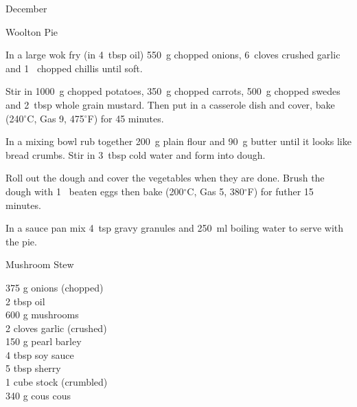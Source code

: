 \begin{menu}{December}
\begin{recipe}{2}{Woolton Pie}
\begin{ingredients}
		\end{ingredients}
	
	
    \begin{instructions}
    \item 
        In a large wok fry
        (in 4~tbsp  oil)
        550~g chopped onions,
        6~cloves crushed garlic
        and
        1~ chopped chillis
        until soft.
      \item 
        Stir in
        1000~g chopped potatoes,
        350~g chopped carrots,
        500~g chopped swedes
        and
        2~tbsp  whole grain mustard.
        Then put in a casserole dish and cover,
        bake (240$^{\circ}$C, Gas 9, 475$^{\circ}$F) for 45 minutes.
      \item 
        In a mixing bowl
        rub together
        200~g  plain flour
        and
        90~g  butter
        until it looks like bread crumbs.
        Stir in
        3~tbsp  cold water
        and form into dough.
      \item 
        Roll out the dough and cover the vegetables when they are done.
        Brush the dough with 1~ beaten eggs
        then bake (200$^{\circ}$C, Gas 5, 380$^{\circ}$F) for futher 15 minutes.
      \item 
        In a sauce pan mix
        4~tsp  gravy granules
        and
        250~ml  boiling water
        to serve with the pie.
      
    \end{instructions}
    \end{recipe}%
  
    \begin{recipe}{2}{Mushroom Stew}%
		\begin{ingredients}
		375 g onions (chopped) \\
	2 tbsp oil  \\
	600 g mushrooms  \\
	2 cloves garlic (crushed) \\
	150 g pearl barley  \\
	4 tbsp soy sauce  \\
	5 tbsp sherry  \\
	1 cube stock (crumbled) \\
	340 g cous cous  \\
	
		\end{ingredients}
	
	

\end{recipe}
\end{menu}

